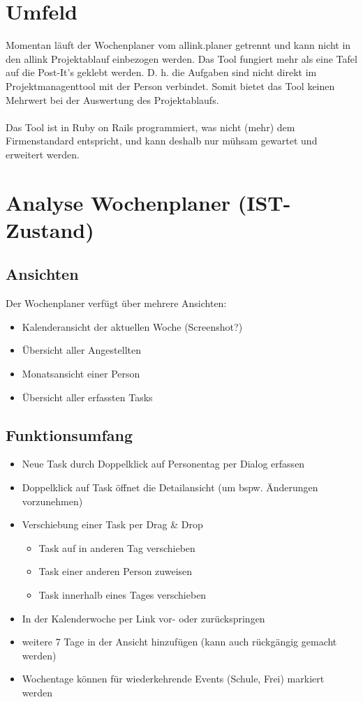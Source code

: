 \section{Umfeld}
Momentan läuft der Wochenplaner vom allink.planer getrennt und kann nicht in den allink Projektablauf einbezogen werden.
Das Tool fungiert mehr als eine Tafel auf die Post-It's geklebt werden. D. h. die Aufgaben sind nicht direkt im Projektmanagenttool mit der Person verbindet.
Somit bietet das Tool keinen Mehrwert bei der Auswertung des Projektablaufs.\\
\\
Das Tool ist in Ruby on Rails programmiert, was nicht (mehr) dem Firmenstandard entspricht, und kann deshalb nur mühsam gewartet und erweitert werden.

\section{Analyse Wochenplaner (IST-Zustand)}
\subsection{Ansichten}
Der Wochenplaner verfügt über mehrere Ansichten:
\begin{itemize}
    \item Kalenderansicht der aktuellen Woche (Screenshot?)
    \item Übersicht aller Angestellten
    \item Monatsansicht einer Person
    \item Übersicht aller erfassten Tasks
\end{itemize}

\subsection{Funktionsumfang}
\begin{itemize}
    \item Neue Task durch Doppelklick auf Personentag per Dialog erfassen
    \item Doppelklick auf Task öffnet die Detailansicht (um bspw. Änderungen vorzunehmen)
    \item Verschiebung einer Task per Drag \& Drop
    \begin{itemize}
        \item Task auf in anderen Tag verschieben
        \item Task einer anderen Person zuweisen
        \item Task innerhalb eines Tages verschieben
    \end{itemize}
    \item In der Kalenderwoche per Link vor- oder zurückspringen
    \item weitere 7 Tage in der Ansicht hinzufügen (kann auch rückgängig gemacht werden)
    \item Wochentage können für wiederkehrende Events (Schule, Frei) markiert werden
\end{itemize}

